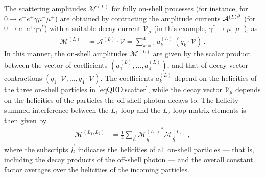 \documentclass[main.tex]{subfiles}
\begin{document}
The scattering amplitudes $\mathcal{M}^{(L)}$ for fully on-shell processes (for instance, for $0 \to e^-e^+ \gamma \mu^-\mu^+$) are obtained by contracting the amplitude currents ${\mathcal{A}^{(L)}}^{\mu}$ (for $0 \to e^-e^+ \gamma \gamma^*$) with a suitable decay current $\mathcal{V}_\mu$ (in this example, $\gamma^*\to\mu^-\mu^+$), as
\begin{align}
    \label{eqQED:on-shell-amps}
    \mathcal{M}^{(L)} &\coloneqq \mathcal{A}^{(L)} \cdot\mathcal{V}  = \sum_{k=1}^4 a_k^{(L)} \, \left( q_k\cdot\mathcal{V} \right) \,.
\end{align}
In this manner, the on-shell amplitudes $\mathcal{M}^{(L)}$ are given by the scalar product between the vector of coefficients $(a_1^{(L)}, \ldots, a_4^{(L)})$, and that of decay-vector contractions $(q_1\cdot\mathcal{V}, \ldots, q_4\cdot\mathcal{V} )$.
The coefficients $a^{(L)}_k$ depend on the helicities of the three on-shell particles in \cref{eqQED:scatter}, while the decay vector $\mathcal{V}_{\mu}$ depends on the helicities of the particles the off-shell photon decays to.
The helicity-summed interference between the $L_1$-loop and the $L_2$-loop matrix elements is then given by
\begin{align} \label{eqQED:squared_M}
    \mathcal{M}^{(L_1,L_2)} &= \frac{1}{4} \sum_{\vec{h}} {\mathcal{M}^{(L_1)}_{\vec{h}}}^* \mathcal{M}^{(L_2)}_{\vec{h}} \,,
\end{align}
where the subscripts $\vec{h}$ indicates the helicities of all on-shell particles --- that is, including the decay products of the off-shell photon --- and the overall constant factor averages over the helicities of the incoming particles.

\smallskip
\end{document}
